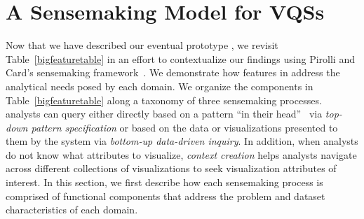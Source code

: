  \section{A Sensemaking Model for VQSs\label{sec:sensemaking}}
 Now that we have described our eventual prototype \zvpp, we revisit Table~\ref{bigfeaturetable} in an effort to contextualize our findings using Pirolli and Card's sensemaking framework~\cite{Pirolli}. We demonstrate how features in \zvpp address the analytical needs posed by each domain. We organize the components in Table~\ref{bigfeaturetable} along a taxonomy of three sensemaking processes. %
  analysts can query either directly based on a pattern ``in their head''~\cite{Sedlmair2012} via \emph{top-down pattern specification} or based on the data or visualizations presented to them by the system via \emph{bottom-up data-driven inquiry}. In addition, when analysts do not know what attributes to visualize, \emph{context creation} helps analysts navigate across different collections of visualizations to seek visualization attributes of interest. In this section, we first describe  how each sensemaking process is comprised of functional components that address the problem and dataset characteristics of each domain. 
